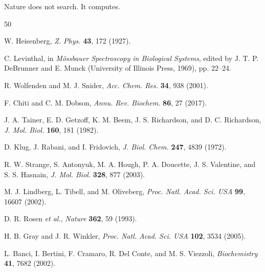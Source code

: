 \documentclass[twocolumn,aps,prx,superscriptaddress,longbibliography]{revtex4-2}
\theoremstyle{remark}
\begin{document}
Nature does not search. It computes.

\begin{thebibliography}{50}

W. Heisenberg, \textit{Z. Phys.} \textbf{43}, 172 (1927).

C. Levinthal, in \textit{M\"ossbauer Spectroscopy in Biological Systems},
edited by J. T. P. DeBrunner and E. Munck (University of Illinois Press,
1969), pp. 22--24.

R. Wolfenden and M. J. Snider, \textit{Acc. Chem. Res.} \textbf{34},
938 (2001).

F. Chiti and C. M. Dobson, \textit{Annu. Rev. Biochem.} \textbf{86},
27 (2017).

J. A. Tainer, E. D. Getzoff, K. M. Beem, J. S. Richardson, and
D. C. Richardson, \textit{J. Mol. Biol.} \textbf{160}, 181 (1982).

D. Klug, J. Rabani, and I. Fridovich, \textit{J. Biol. Chem.}
\textbf{247}, 4839 (1972).

R. W. Strange, S. Antonyuk, M. A. Hough, P. A. Doucette, J. S. Valentine,
and S. S. Hasnain, \textit{J. Mol. Biol.} \textbf{328}, 877 (2003).

M. J. Lindberg, L. Tibell, and M. Oliveberg, \textit{Proc. Natl. Acad.
Sci. USA} \textbf{99}, 16607 (2002).

D. R. Rosen \textit{et al.}, \textit{Nature} \textbf{362}, 59 (1993).

H. B. Gray and J. R. Winkler, \textit{Proc. Natl. Acad. Sci. USA}
\textbf{102}, 3534 (2005).

L. Banci, I. Bertini, F. Cramaro, R. Del Conte, and M. S. Viezzoli,
\textit{Biochemistry} \textbf{41}, 7682 (2002).

\end{thebibliography}
\end{document}
